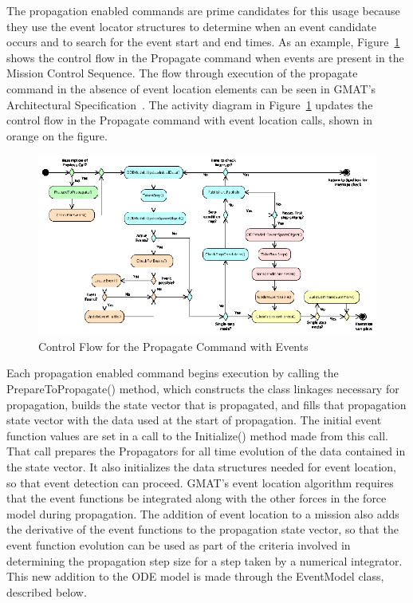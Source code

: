 \documentclass[letterpaper,10pt]{article}
\begin{document}
The propagation enabled commands are prime candidates for this usage because
they use the event locator structures to determine when an event candidate
occurs and to search for the event start and end times.  As an example, 
Figure~\ref{fig:PropagateWithEvents} shows the control flow in the Propagate
command when events are present in the Mission Control Sequence.  The flow
through execution of the propagate command in the absence of event location
elements can be seen in GMAT's Architectural Specification~\cite{archspec}. The
activity diagram in Figure~\ref{fig:PropagateWithEvents} updates the control
flow in the Propagate command with event location calls, shown in orange on the
figure.   

\begin{figure}
\begin{center}
\includegraphics[scale=1.7]{./Images/ExecutePropEvents.eps}
\caption{\label{fig:PropagateWithEvents}Control Flow for the Propagate
Command with Events}
\end{center}
\end{figure} 

Each propagation enabled command begins execution by calling the
PrepareToPropagate() method, which constructs the class linkages necessary for
propagation, builds the state vector that is propagated, and fills that
propagation state vector with the data used at the start of propagation.  The
initial event function values are set in a call to the Initialize() method made
from this call.  That call prepares the Propagators for all time evolution of
the data contained in the state vector. It also initializes the data structures
needed for event location, so that event detection can proceed.  GMAT's event location algorithm requires that the event functions be integrated along with the other forces in the force model during propagation. The addition of event location to a mission also adds the derivative of the event functions to the propagation state vector, so that the event function evolution can be used as part of the criteria involved in determining the propagation step size for a step taken by a numerical integrator.  This new addition to the ODE model is made through the EventModel class, described below.
\end{document}
